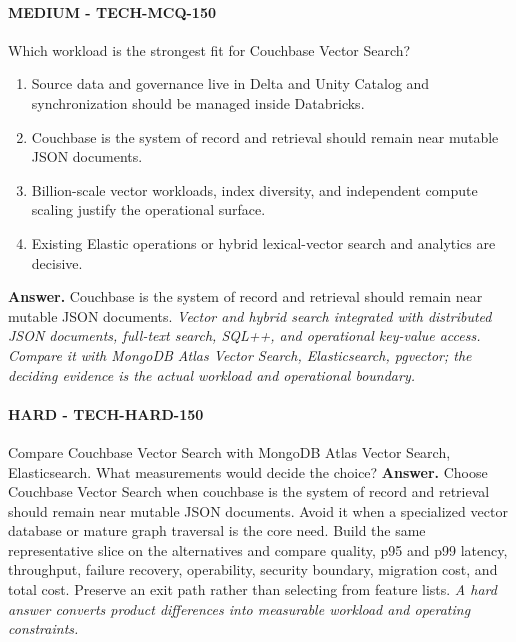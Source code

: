 \paragraph{MEDIUM - TECH-MCQ-150} Which workload is the strongest fit for Couchbase Vector Search?
\begin{enumerate}[label=\Alph*.]
\item Source data and governance live in Delta and Unity Catalog and synchronization should be managed inside Databricks.
\item Couchbase is the system of record and retrieval should remain near mutable JSON documents.
\item Billion-scale vector workloads, index diversity, and independent compute scaling justify the operational surface.
\item Existing Elastic operations or hybrid lexical-vector search and analytics are decisive.
\end{enumerate}
\textbf{Answer.} Couchbase is the system of record and retrieval should remain near mutable JSON documents.
\textit{Vector and hybrid search integrated with distributed JSON documents, full-text search, SQL++, and operational key-value access. Compare it with MongoDB Atlas Vector Search, Elasticsearch, pgvector; the deciding evidence is the actual workload and operational boundary.}
\paragraph{HARD - TECH-HARD-150} Compare Couchbase Vector Search with MongoDB Atlas Vector Search, Elasticsearch. What measurements would decide the choice?
\textbf{Answer.} Choose Couchbase Vector Search when couchbase is the system of record and retrieval should remain near mutable JSON documents. Avoid it when a specialized vector database or mature graph traversal is the core need. Build the same representative slice on the alternatives and compare quality, p95 and p99 latency, throughput, failure recovery, operability, security boundary, migration cost, and total cost. Preserve an exit path rather than selecting from feature lists.
\textit{A hard answer converts product differences into measurable workload and operating constraints.}
